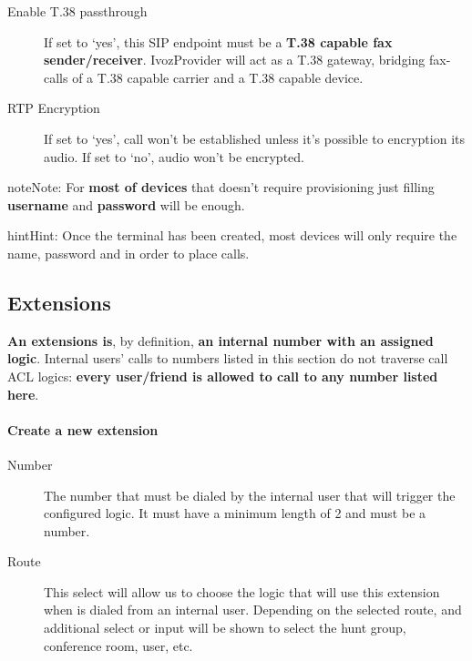 \documentclass[letterpaper,10pt,english]{sphinxmanual}
\begin{document}
\begin{description}
\item[{Enable T.38 passthrough}] \leavevmode{}\label{administration_portal/client/vpbx/terminals:term-enable-t-38-passthrough}
If set to `yes', this SIP endpoint must be a \textbf{T.38 capable fax sender/receiver}. IvozProvider
will act as a T.38 gateway, bridging fax-calls of a T.38 capable carrier and a T.38 capable device.

\item[{RTP Encryption}] \leavevmode{}\label{administration_portal/client/vpbx/terminals:term-rtp-encryption}
If set to `yes', call won't be established unless it's possible to encryption its audio. If set to `no',
audio won't be encrypted.

\end{description}

\begin{notice}{note}{Note:}
For \textbf{most of devices} that doesn't require provisioning just
filling \textbf{username} and \textbf{password} will be enough.
\end{notice}

\begin{notice}{hint}{Hint:}
Once the terminal has been created, most devices will only
require the name, password and {\hyperref[getting_started/internal_calls/brand_portal:domain\string-per\string-client]{}}
in order to place calls.
\end{notice}


\subsection{Extensions}
\label{administration_portal/client/vpbx/extensions:extensions}\label{administration_portal/client/vpbx/extensions::doc}
\textbf{An extensions is}, by definition, \textbf{an internal number with an assigned
logic}. Internal users' calls to numbers listed in this section do not traverse
call ACL logics: \textbf{every user/friend is allowed to call to any number listed here}.
\paragraph{Create a new extension}
\begin{description}
\item[{Number}] \leavevmode{}\label{administration_portal/client/vpbx/extensions:term-number}
The number that must be dialed by the internal user that will trigger
the configured logic. It must have a minimum length of 2 and must be
a number.

\item[{Route}] \leavevmode{}\label{administration_portal/client/vpbx/extensions:term-route}
This select will allow us to choose the logic that will use this
extension when is dialed from an internal user. Depending on the selected
route, and additional select or input will be shown to select the
hunt group, conference room, user, etc.

\end{description}
\end{document}
